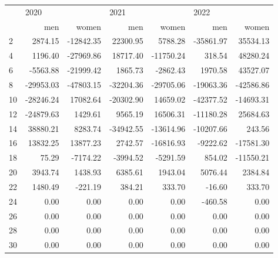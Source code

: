 \begin{tabular}{lrrrrrr}
\toprule
{} & \multicolumn{2}{l}{2020} & \multicolumn{2}{l}{2021} & \multicolumn{2}{l}{2022} \\
{} &       men &     women &       men &     women &       men &     women \\
\midrule
2  &   2874.15 & -12842.35 &  22300.95 &   5788.28 & -35861.97 &  35534.13 \\
4  &   1196.40 & -27969.86 &  18717.40 & -11750.24 &    318.54 &  48280.24 \\
6  &  -5563.88 & -21999.42 &   1865.73 &  -2862.43 &   1970.58 &  43527.07 \\
8  & -29953.03 & -47803.15 & -32204.36 & -29705.06 & -19063.36 & -42586.86 \\
10 & -28246.24 &  17082.64 & -20302.90 &  14659.02 & -42377.52 & -14693.31 \\
12 & -24879.63 &   1429.61 &   9565.19 &  16506.31 & -11180.28 &  25684.63 \\
14 &  38880.21 &   8283.74 & -34942.55 & -13614.96 & -10207.66 &    243.56 \\
16 &  13832.25 &  13877.23 &   2742.57 & -16816.93 &  -9222.62 & -17581.30 \\
18 &     75.29 &  -7174.22 &  -3994.52 &  -5291.59 &    854.02 & -11550.21 \\
20 &   3943.74 &   1438.93 &   6385.61 &   1943.04 &   5076.44 &   2384.84 \\
22 &   1480.49 &   -221.19 &    384.21 &    333.70 &    -16.60 &    333.70 \\
24 &      0.00 &      0.00 &      0.00 &      0.00 &   -460.58 &      0.00 \\
26 &      0.00 &      0.00 &      0.00 &      0.00 &      0.00 &      0.00 \\
28 &      0.00 &      0.00 &      0.00 &      0.00 &      0.00 &      0.00 \\
30 &      0.00 &      0.00 &      0.00 &      0.00 &      0.00 &      0.00 \\
\bottomrule
\end{tabular}
